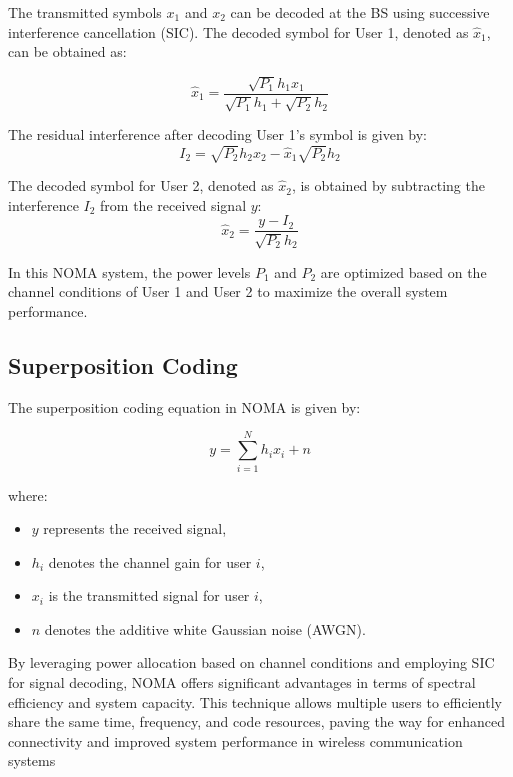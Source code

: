 \documentclass[conference]{IEEEtran}
\begin{document}
The transmitted symbols $x_1$ and $x_2$ can be decoded at the BS using successive interference cancellation (SIC). The decoded symbol for User 1, denoted as $\hat{x}_1$, can be obtained as:

\begin{equation*}
    \hat{x}_1 = \frac{\sqrt{P_1} h_1 x_1}{\sqrt{P_1} h_1 + \sqrt{P_2} h_2}
\end{equation*}

The residual interference after decoding User 1's symbol is given by:
\begin{equation*}
    I_2 = \sqrt{P_2} h_2 x_2 - \hat{x}_1 \sqrt{P_2} h_2
\end{equation*}

The decoded symbol for User 2, denoted as $\hat{x}_2$, is obtained by subtracting the interference $I_2$ from the received signal $y$:
\begin{equation*}
    \hat{x}_2 = \frac{y - I_2}{\sqrt{P_2} h_2}
\end{equation*}

In this NOMA system, the power levels $P_1$ and $P_2$ are optimized based on the channel conditions of User 1 and User 2 to maximize the overall system performance.

\subsection{Superposition Coding}
The superposition coding equation in NOMA is given by:

\[
y = \sum_{i=1}^{N} h_i x_i + n
\]

where:
\begin{itemize}
  \item $y$ represents the received signal,
  \item $h_i$ denotes the channel gain for user $i$,
  \item $x_i$ is the transmitted signal for user $i$,
  \item $n$ denotes the additive white Gaussian noise (AWGN).
\end{itemize}


By leveraging power allocation based on channel conditions and employing SIC for signal decoding, NOMA offers significant advantages in terms of spectral efficiency and system capacity. This technique allows multiple users to efficiently share the same time, frequency, and code resources, paving the way for enhanced connectivity and improved system performance in wireless communication systems
\end{document}
